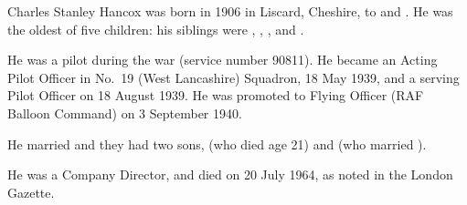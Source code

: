 
Charles Stanley Hancox was born in 1906 in Liscard, Cheshire, to  and .\cite{CSHancoxBirth}
He was the oldest of five children: his siblings were ,
, , and .

He was a pilot during the war (service number 90811).
He became an Acting Pilot Officer in No.~19 (West Lancashire) Squadron, 18 May 1939, \cite{CSHancox1} and a serving Pilot Officer on 18 August 1939. \cite{CSHancox2}  He was promoted to Flying Officer (RAF Balloon Command) on 3 September 1940. \cite{CSHancox3}

He married  and they had two sons,  (who died age 21) and  (who married ).

He was a Company Director, and died on 20 July 1964, as noted in the London Gazette.\cite{CSHancoxDeath}
